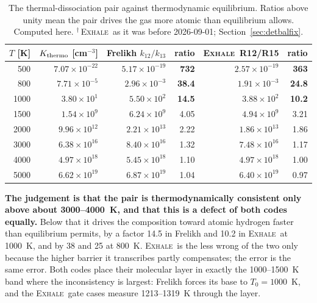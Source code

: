 \documentclass[english,a4paper]{my_memo}
\newcommand{\tabsetup}{\footnotesize\linespread{1.05}\selectfont
  \renewcommand{\arraystretch}{1.15}}
\newcommand{\EXHALE}{\textsc{Exhale}}
\begin{document}
{\tabsetup
\begin{table}[htbp]\centering
\caption{The thermal-dissociation pair against thermodynamic equilibrium.
Ratios above unity mean the pair drives the gas more atomic than equilibrium
allows. Computed here. $^{\dagger}$\,\EXHALE\ as it was before 2026-09-01;
Section~\ref{sec:detbalfix}.}\label{tab:detbal}
\begin{tabular}{@{}r r r r r r@{}}
\toprule
$T$ [K] & $K_{\rm thermo}$ [cm$^{-3}$] & Frelikh $k_{12}/k_{13}$ & ratio &
\EXHALE\ R12/R15\rlap{$^{\dagger}$} & ratio \\
\midrule
 500 & $7.07\times10^{-22}$ & $5.17\times10^{-19}$ & \textbf{732} &
       $2.57\times10^{-19}$ & \textbf{363} \\
 800 & $7.71\times10^{-5}$ & $2.96\times10^{-3}$ & \textbf{38.4} &
       $1.91\times10^{-3}$ & \textbf{24.8} \\
1000 & $3.80\times10^{1}$ & $5.50\times10^{2}$ & \textbf{14.5} &
       $3.88\times10^{2}$ & \textbf{10.2} \\
1500 & $1.54\times10^{9}$ & $6.24\times10^{9}$ & 4.05 &
       $4.94\times10^{9}$ & 3.21 \\
2000 & $9.96\times10^{12}$ & $2.21\times10^{13}$ & 2.22 &
       $1.86\times10^{13}$ & 1.86 \\
3000 & $6.38\times10^{16}$ & $8.40\times10^{16}$ & 1.32 &
       $7.48\times10^{16}$ & 1.17 \\
4000 & $4.97\times10^{18}$ & $5.45\times10^{18}$ & 1.10 &
       $4.97\times10^{18}$ & 1.00 \\
5000 & $6.62\times10^{19}$ & $6.87\times10^{19}$ & 1.04 &
       $6.40\times10^{19}$ & 0.97 \\
\bottomrule
\end{tabular}
\end{table}}

\textbf{The judgement is that the pair is thermodynamically consistent only
above about 3000--4000~K, and that this is a defect of both codes equally.}
Below that it drives the composition toward atomic hydrogen faster than
equilibrium permits, by a factor 14.5 in Frelikh and 10.2 in \EXHALE\ at
1000~K, and by 38 and 25 at 800~K. \EXHALE\ is the less wrong of the two only
because the higher barrier it transcribes partly compensates; the error is the
same error. Both codes place their molecular layer in exactly the 1000--1500~K
band where the inconsistency is largest: Frelikh forces its base to
$T_0 = 1000$~K, and the \EXHALE\ gate cases measure 1213--1319~K through the
layer.
\end{document}
